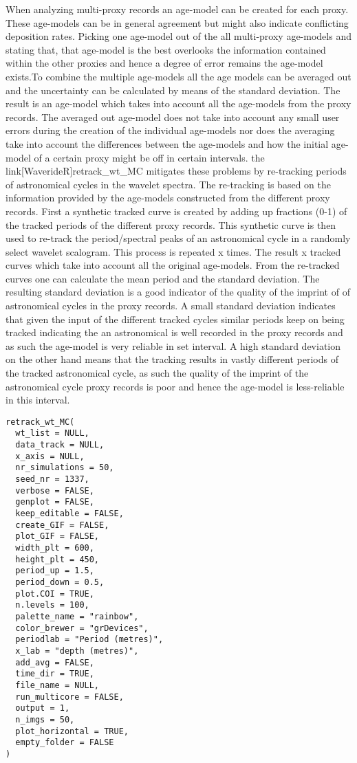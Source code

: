 \documentclass[a4paper]{book}
\begin{document}
%
\begin{Description}
When analyzing multi-proxy records an age-model can be created
for each proxy. These age-models can be in general agreement but might also
indicate conflicting deposition rates. Picking one age-model out of the all
multi-proxy age-models and stating that, that age-model is the best overlooks
the information contained within the other proxies and hence a degree of error
remains the age-model exists.To combine the multiple age-models all the age
models can be averaged out and the uncertainty can be calculated by means
of the standard deviation. The result is an age-model which takes into
account all the age-models from the proxy records. The averaged out age-model
does not take into account any small user errors during  the creation of the
individual age-models nor does the averaging take into account the differences
between the age-models and how the initial age-model of a certain proxy might
be off in certain intervals. the link[WaverideR]retrack\_wt\_MC mitigates
these problems by re-tracking periods of astronomical cycles in the wavelet
spectra. The re-tracking is based on the information provided by the
age-models constructed from the different proxy records.
First a synthetic tracked curve is created by adding up fractions (0-1) of
the tracked periods of the different proxy records. This synthetic curve is
then used to re-track the period/spectral peaks of an astronomical cycle
in a randomly select wavelet scalogram. This process is repeated x times.
The result x tracked curves which take into account all the original
age-models. From the re-tracked curves one can calculate the mean period and
the standard deviation. The resulting  standard deviation is a good
indicator of the quality of the imprint of of astronomical cycles in the
proxy records. A small standard deviation indicates that given the input
of the different tracked cycles similar periods keep on being tracked
indicating the an astronomical is well recorded in the proxy records and as
such the age-model is very reliable in set interval. A high standard
deviation on the other hand means that the tracking results in vastly
different periods of the tracked astronomical cycle, as such the quality of
the imprint of the astronomical cycle proxy records is poor and hence the
age-model is less-reliable in this interval.
\end{Description}
%
\begin{Usage}
\begin{verbatim}
retrack_wt_MC(
  wt_list = NULL,
  data_track = NULL,
  x_axis = NULL,
  nr_simulations = 50,
  seed_nr = 1337,
  verbose = FALSE,
  genplot = FALSE,
  keep_editable = FALSE,
  create_GIF = FALSE,
  plot_GIF = FALSE,
  width_plt = 600,
  height_plt = 450,
  period_up = 1.5,
  period_down = 0.5,
  plot.COI = TRUE,
  n.levels = 100,
  palette_name = "rainbow",
  color_brewer = "grDevices",
  periodlab = "Period (metres)",
  x_lab = "depth (metres)",
  add_avg = FALSE,
  time_dir = TRUE,
  file_name = NULL,
  run_multicore = FALSE,
  output = 1,
  n_imgs = 50,
  plot_horizontal = TRUE,
  empty_folder = FALSE
)
\end{verbatim}
\end{Usage}
\end{document}
